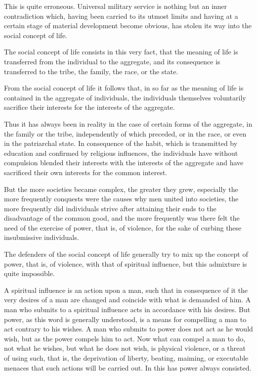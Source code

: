 \documentclass{book}
\begin{document}
This is quite erroneous. Universal military service is nothing but an inner contradiction which, having been carried to its utmost limits and having at a certain stage of material development become obvious, has stolen its way into the social concept of life.

The social concept of life consists in this very fact, that the meaning of life is transferred from the individual to the aggregate, and its consequence is transferred to the tribe, the family, the race, or the state.

From the social concept of life it follows that, in so far as the meaning of life is contained in the aggregate of individuals, the individuals themselves voluntarily sacrifice their interests for the interests of the aggregate.

Thus it has always been in reality in the case of certain forms of the aggregate, in the family or the tribe, independently of which preceded, or in the race, or even in the patriarchal state. In consequence of the habit, which is transmitted by education and confirmed by religious influences, the individuals have without compulsion blended their interests with the interests of the aggregate and have sacrificed their own interests for the common interest.

But the more societies became complex, the greater they grew, especially the more frequently conquests were the causes why men united into societies, the more frequently did individuals strive after attaining their ends to the disadvantage of the common good, and the more frequently was there felt the need of the exercise of power, that is, of violence, for the sake of curbing these insubmissive individuals.

The defenders of the social concept of life generally try to mix up the concept of power, that is, of violence, with that of spiritual influence, but this admixture is quite impossible.

A spiritual influence is an action upon a man, such that in consequence of it the very desires of a man are changed and coincide with what is demanded of him. A man who submits to a spiritual influence acts in accordance with his desires. But power, as this word is generally understood, is a means for compelling a man to act contrary to his wishes. A man who submits to power does not act as he would wish, but as the power compels him to act. Now what can compel a man to do, not what he wishes, but what he does not wish, is physical violence, or a threat of using such, that is, the deprivation of liberty, beating, maiming, or executable menaces that such actions will be carried out. In this has power always consisted.
\end{document}
